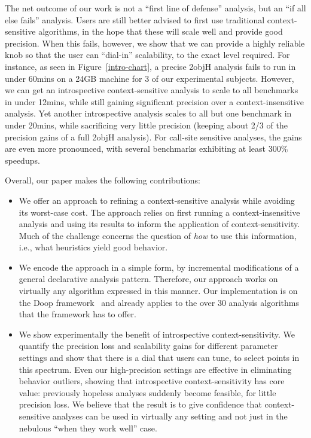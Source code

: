 The net outcome of our work is not a ``first line of defense''
analysis, but an ``if all else fails'' analysis. Users are still
better advised to first use traditional context-sensitive algorithms,
in the hope that these will scale well and provide good
precision. When this fails, however, we show that we can provide a
highly reliable knob 
so that the user can ``dial-in'' scalability, to the exact level
required. For instance, as seen in Figure~\ref{intro-chart}, a precise
2objH analysis fails to run in under 60mins on a 24GB machine for 3 of
our experimental subjects. However, we can get an introspective
context-sensitive analysis to scale to all benchmarks in under 12mins,
while still gaining significant precision over a context-insensitive
analysis. Yet another introspective analysis scales to all but one
benchmark in under 20mins, while sacrificing very little precision
(keeping about 2/3 of the precision gains of a full 2objH analysis).
For call-site sensitive analyses, the gains are even more pronounced,
with several benchmarks exhibiting at least 300\% speedups.

Overall, our paper makes the following contributions:

\begin{itemize}
\item We offer an approach to refining a context-sensitive analysis
  while avoiding its worst-case cost. The approach relies on first
  running a context-insensitive analysis and using its results to
  inform the application of context-sensitivity. Much of the challenge
  concerns the question of \emph{how} to use this information, i.e., 
  what heuristics yield good behavior.

\item We encode the approach in a simple form, by incremental modifications
  of a general declarative analysis pattern. Therefore, our approach
  works on virtually any algorithm expressed in this manner. Our
  implementation is on the Doop framework~\cite{BS-OOPSLA09} and already
  applies to the over 30 analysis algorithms that the framework has to offer.

\item We show experimentally the benefit of introspective
  context-sensitivity. We quantify the precision loss and scalability
  gains for different parameter settings and show that there is a dial
  that users can tune, to select points in this spectrum. Even our
  high-precision settings are effective in eliminating behavior outliers,
  showing that introspective context-sensitivity has core value:
  previously hopeless analyses suddenly become feasible, for little
  precision loss. We believe that the result is to give confidence
  that context-sensitive analyses can be used in virtually any setting
  and not just in the nebulous ``when they work well'' case.

\end{itemize}



